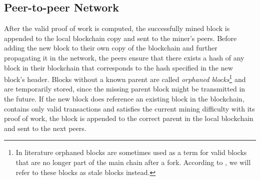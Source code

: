 \documentclass[a4paper,12pt,twoside]{report}
\begin{document}
\subsection{Peer-to-peer Network} \label{peer2peer}
After the valid proof of work is computed, the successfully mined block is appended to the local blockchain copy and sent to the miner's peers. Before adding the new block to their own copy of the blockchain and further propagating it in the network, the peers ensure that there exists a hash of any block in their blockchain that corresponds to the hash specified in the new block's header. Blocks without a known parent are called \textit{orphaned blocks}\footnote{In literature orphaned blocks are sometimes used as a term for valid blocks that are no longer part of the main chain after a fork. According to \cite{staleblocks}, we will refer to these blocks as stale blocks instead.} and are temporarily stored, since the missing parent block might be transmitted in the future. If the new block does reference an existing block in the blockchain, contains only valid transactions and satisfies the current mining difficulty with its proof of work, the block is appended to the correct parent in the local blockchain and sent to the next peers. 
\end{document}
